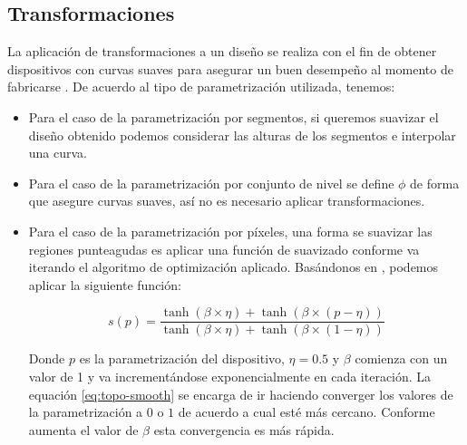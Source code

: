 \subsection{Transformaciones}

La aplicación de transformaciones a un diseño se realiza con el fin de obtener dispositivos con curvas suaves para asegurar un buen desempeño al momento de fabricarse \citep{Su2020}. 
De acuerdo al tipo de parametrización utilizada, tenemos:

\begin{itemize}
  \item Para el caso de la parametrización por segmentos, si queremos suavizar el diseño obtenido podemos considerar las alturas de los segmentos e interpolar una curva.

  \item Para el caso de la parametrización por conjunto de nivel se define $\phi$ de forma que asegure curvas suaves, así no es necesario aplicar transformaciones.

  \item Para el caso de la parametrización por píxeles, una forma se suavizar las regiones punteagudas es aplicar una función de suavizado conforme va iterando el algoritmo de optimización aplicado. Basándonos en \cite{Zhang2021}, podemos aplicar la siguiente función:

\begin{equation}
  s(p) = \frac{\tanh (\beta \times \eta) + \tanh (\beta \times (p - \eta))}{\tanh (\beta \times \eta) + \tanh (\beta \times (1 - \eta))}
  \label{eq:topo-smooth}
\end{equation}

    Donde $p$ es la parametrización del dispositivo, $\eta = 0.5$ y $\beta$ comienza con un valor de 1 y va incrementándose exponencialmente en cada iteración. 
    La equación \ref{eq:topo-smooth} se encarga de ir haciendo converger los valores de la parametrización a $0$ o $1$ de acuerdo a cual esté más cercano. 
    Conforme aumenta el valor de $\beta$ esta convergencia es más rápida.

\end{itemize}

